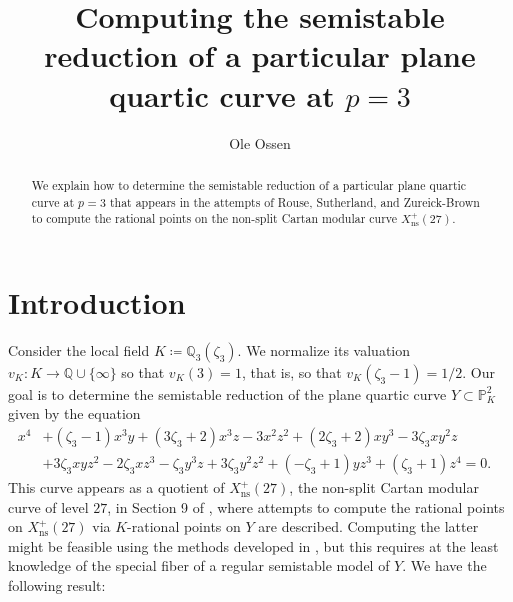 \documentclass[11pt]{amsart}
\newcommand{\BP}{{\mathbb{P}}}
\newcommand{\BQ}{{\mathbb{Q}}}
\theoremstyle{definition}
\begin{document}
\title{Computing the semistable reduction of a particular plane quartic curve at $p=3$}

\begin{abstract}
We explain how to determine the semistable reduction of a particular plane quartic curve at $p=3$ that appears in the attempts of Rouse, Sutherland, and Zureick-Brown to compute the rational points on the non-split Cartan modular curve $X^+_\textrm{ns}(27)$.
\end{abstract}

\author{Ole Ossen}


\maketitle



\section*{Introduction}

Consider the local field $K\coloneqq\BQ_3(\zeta_3)$. We normalize its valuation $v_K\colon K\to\BQ\cup\{\infty\}$ so that $v_K(3)=1$, that is, so that $v_K(\zeta_3-1)=1/2$. Our goal is to determine the semistable reduction of the plane quartic curve $Y\subset\BP_K^2$ given by the equation
\begin{equation}
\label{eq-quartic-as-given}
\begin{aligned}
x^4 &+ (\zeta_3 - 1)x^3y + (3\zeta_3 + 2)x^3z - 3x^2z^2 + (2\zeta_3 + 2)xy^3 - 3\zeta_3 xy^2z&\\
&+ 3\zeta_3 xyz^2 - 2\zeta_3 xz^3 - \zeta_3 y^3z + 3\zeta_3 y^2z^2 + (-\zeta_3 + 1)yz^3 + (\zeta_3 + 1)z^4=0.
\end{aligned}
\end{equation}
This curve appears as a quotient of $X^+_\textrm{ns}(27)$, the non-split Cartan modular curve of level $27$, in Section 9 of \cite{rousesutherlandzureickbrown}, where attempts to compute the rational points on $X^+_\textrm{ns}(27)$ via $K$-rational points on $Y$ are described. Computing the latter might be feasible using the methods developed in \cite{balakrishnandogramuellertuitmanvonk}, but this requires at the least knowledge of the special fiber of a regular semistable model of $Y$. We have the following result:
\end{document}
